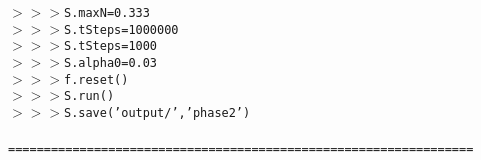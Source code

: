 {{\begin{tabbing}
{\texttt{$>$$>$$>$\hspace{6pt}S.maxN\hspace{6pt}=\hspace{6pt}0.333}}\\
{\texttt{$>$$>$$>$\hspace{6pt}S.tSteps\hspace{6pt}=\hspace{6pt}1000000}}\\
{\texttt{$>$$>$$>$\hspace{6pt}S.tSteps\hspace{6pt}=\hspace{6pt}1000}}\\
{\texttt{$>$$>$$>$\hspace{6pt}S.alpha0\hspace{6pt}=\hspace{6pt}0.03}}\\
{\texttt{$>$$>$$>$\hspace{6pt}f.reset()}}\\
{\texttt{$>$$>$$>$\hspace{6pt}S.run()}}\\
{\texttt{$>$$>$$>$\hspace{6pt}S.save({'}output/{'},{'}phase2{'})}}\\
\\
{\texttt{=================================================================}}\\
\end{tabbing}}}
